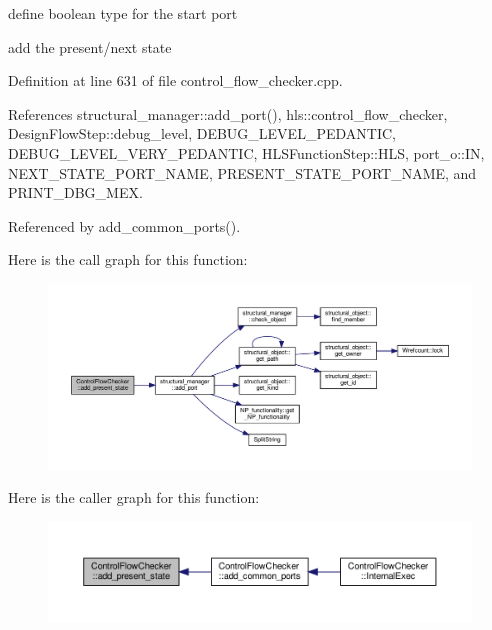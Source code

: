 define boolean type for the start port

add the present/next state 

Definition at line 631 of file control\+\_\+flow\+\_\+checker.\+cpp.



References structural\+\_\+manager\+::add\+\_\+port(), hls\+::control\+\_\+flow\+\_\+checker, Design\+Flow\+Step\+::debug\+\_\+level, D\+E\+B\+U\+G\+\_\+\+L\+E\+V\+E\+L\+\_\+\+P\+E\+D\+A\+N\+T\+IC, D\+E\+B\+U\+G\+\_\+\+L\+E\+V\+E\+L\+\_\+\+V\+E\+R\+Y\+\_\+\+P\+E\+D\+A\+N\+T\+IC, H\+L\+S\+Function\+Step\+::\+H\+LS, port\+\_\+o\+::\+IN, N\+E\+X\+T\+\_\+\+S\+T\+A\+T\+E\+\_\+\+P\+O\+R\+T\+\_\+\+N\+A\+ME, P\+R\+E\+S\+E\+N\+T\+\_\+\+S\+T\+A\+T\+E\+\_\+\+P\+O\+R\+T\+\_\+\+N\+A\+ME, and P\+R\+I\+N\+T\+\_\+\+D\+B\+G\+\_\+\+M\+EX.



Referenced by add\+\_\+common\+\_\+ports().

Here is the call graph for this function\+:
\nopagebreak
\begin{figure}[H]
\begin{center}
\leavevmode
\includegraphics[width=350pt]{d0/dea/classControlFlowChecker_ac5e7bcac34c385399655961eebc4ee59_cgraph}
\end{center}
\end{figure}
Here is the caller graph for this function\+:
\nopagebreak
\begin{figure}[H]
\begin{center}
\leavevmode
\includegraphics[width=350pt]{d0/dea/classControlFlowChecker_ac5e7bcac34c385399655961eebc4ee59_icgraph}
\end{center}
\end{figure}
\mbox{\label{classControlFlowChecker_a8f2801e5c890005e2a9dcf43bd9c03de}} 
